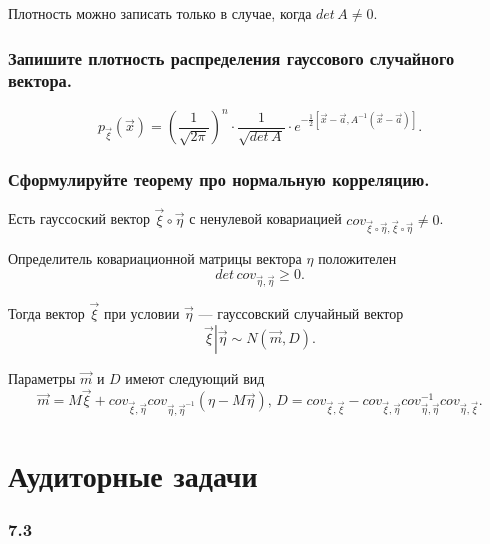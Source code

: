 Плотность можно записать только в случае, когда $det \, A \neq 0$.

\subsubsection*{Запишите плотность распределения гауссового случайного вектора.}

$$p_{ \vec{ \xi }} \left( \vec{x} \right) =
  \left( \frac{1}{ \sqrt{2 \pi }} \right)^n \cdot \frac{1}{ \sqrt{det \, A}} \cdot
  e^{- \frac{1}{2} \left[ \vec{x} - \vec{a}, A^{-1} \left( \vec{x} - \vec{a} \right) \right] }.$$

\subsubsection*{Сформулируйте теорему про нормальную корреляцию.}

Есть гауссоский вектор $ \vec{ \xi } \circ \vec{ \eta }$ с ненулевой ковариацией
$cov_{ \vec{ \xi } \circ \vec{ \eta }, \vec{ \xi } \circ \vec{ \eta }} \neq 0$.

Определитель ковариационной матрицы вектора $ \eta $ положителен
$$det \, cov_{ \vec{ \eta }, \vec{ \eta }} \geq
  0.$$

Тогда вектор $ \vec{ \xi }$ при условии $ \vec{ \eta }$ ---
гауссовский случайный вектор
$$ \left. \vec{ \xi} \right| \vec{ \eta } \sim
  N \left( \vec{m}, D \right).$$

Параметры $ \vec{m}$ и $D$ имеют следующий вид
$$ \vec{m} =
  M \vec{ \xi } +
  cov_{ \vec{ \xi }, \vec{ \eta }}
    cov_{ \vec{ \eta }, \vec{ \eta }^{-1}} \left( \eta - M \vec{ \eta } \right), \,
  D =
  cov_{ \vec{ \xi }, \vec{ \xi }} -
  cov_{ \vec{ \xi }, \vec{ \eta }} cov_{ \vec{ \eta }, \vec{ \eta }}^{-1}
    cov_{ \vec{ \eta }, \vec{ \xi }}.$$

\section*{Аудиторные задачи}

\subsubsection*{7.3}

